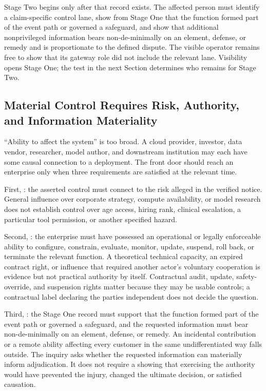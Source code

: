 Stage Two begins only after that record exists. The affected person must identify a claim-specific control lane, show from Stage One that the function formed part of the event path or governed a safeguard, and show that additional nonprivileged information bears non-de-minimally on an element, defense, or remedy and is proportionate to the defined dispute. The visible operator remains free to show that its gateway role did not include the relevant lane. Visibility opens Stage One; the test in the next Section determines who remains for Stage Two.

\subsection{Material Control Requires Risk, Authority, and Information Materiality}
\label{sec:material-control}

``Ability to affect the system'' is too broad. A cloud provider, investor, data vendor, researcher, model author, and downstream institution may each have some causal connection to a deployment. The front door should reach an enterprise only when three requirements are satisfied at the relevant time.

First, : the asserted control must connect to the risk alleged in the verified notice. General influence over corporate strategy, compute availability, or model research does not establish control over age access, hiring rank, clinical escalation, a particular tool permission, or another specified hazard.

Second, : the enterprise must have possessed an operational or legally enforceable ability to configure, constrain, evaluate, monitor, update, suspend, roll back, or terminate the relevant function. A theoretical technical capacity, an expired contract right, or influence that required another actor's voluntary cooperation is evidence but not practical authority by itself. Contractual audit, update, safety-override, and suspension rights matter because they may be usable controls; a contractual label declaring the parties independent does not decide the question.

Third, : the Stage One record must support that the function formed part of the event path or governed a safeguard, and the requested information must bear non-de-minimally on an element, defense, or remedy. An incidental contribution or a remote ability affecting every customer in the same undifferentiated way falls outside. The inquiry asks whether the requested information can materially inform adjudication. It does not require a showing that exercising the authority would have prevented the injury, changed the ultimate decision, or satisfied causation.

